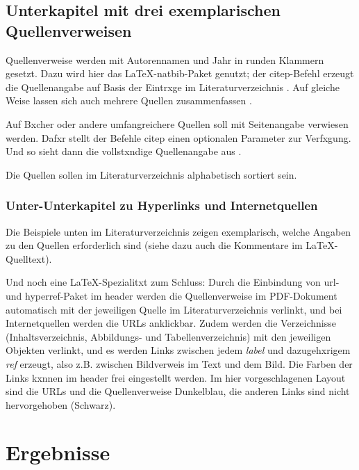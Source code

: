        \section{Unterkapitel mit drei exemplarischen Quellenverweisen}

            Quellenverweise werden mit Autorennamen und Jahr in runden Klammern gesetzt. Dazu wird hier das \LaTeX-natbib-Paket genutzt; der citep-Befehl erzeugt die Quellenangabe auf Basis der Eintrxge im Literaturverzeichnis \citep{bluray}. Auf gleiche Weise lassen sich auch mehrere Quellen zusammenfassen \citep{dooley_streicher,stephenson}. 

            Auf Bxcher oder andere umfangreichere Quellen soll mit Seitenangabe verwiesen werden. Dafxr stellt der Befehle citep  einen optionalen Parameter zur Verfxgung. Und so sieht dann die vollstxndige Quellenangabe aus \citep[116]{kuttruff}. 

            Die Quellen sollen im Literaturverzeichnis alphabetisch sortiert sein.


            \subsection{Unter-Unterkapitel zu Hyperlinks und Internetquellen}

                Die Beispiele unten im Literaturverzeichnis zeigen exemplarisch, welche Angaben zu den Quellen erforderlich sind (siehe dazu auch die Kommentare im \LaTeX-Quelltext). 

                Und noch eine \LaTeX-Spezialitxt zum Schluss: Durch die Einbindung von url- und hyperref-Paket im header werden die Quellenverweise im PDF-Dokument automatisch mit der jeweiligen Quelle im Literaturverzeichnis verlinkt, und bei Internetquellen werden die URLs anklickbar. Zudem werden die Verzeichnisse (Inhaltsverzeichnis, Abbildungs- und Tabellenverzeichnis) mit den jeweiligen Objekten verlinkt, und es werden Links zwischen jedem \emph{label} und  dazugehxrigem \emph{ref} erzeugt, also z.B. zwischen Bildverweis im Text und dem Bild. Die Farben der Links kxnnen im header frei eingestellt werden. Im hier vorgeschlagenen Layout sind die URLs und die Quellenverweise Dunkelblau, die anderen Links sind nicht hervorgehoben (Schwarz). 


    \chapter{Ergebnisse}

